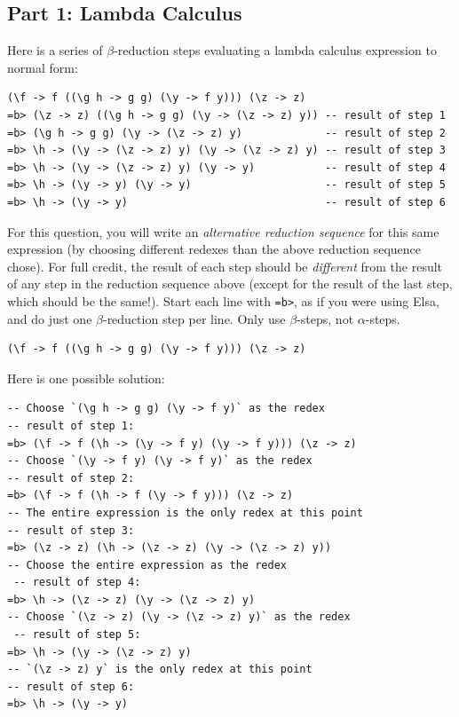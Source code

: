 \documentclass[addpoints]{exam}
\begin{document}
\begin{questions}

\subsection*{\textbf{Part 1: Lambda Calculus}}

\question[5] Here is a series of $\beta$-reduction steps evaluating a lambda calculus expression to normal form:

\begin{verbatim}
(\f -> f ((\g h -> g g) (\y -> f y))) (\z -> z)
=b> (\z -> z) ((\g h -> g g) (\y -> (\z -> z) y)) -- result of step 1
=b> (\g h -> g g) (\y -> (\z -> z) y)             -- result of step 2
=b> \h -> (\y -> (\z -> z) y) (\y -> (\z -> z) y) -- result of step 3
=b> \h -> (\y -> (\z -> z) y) (\y -> y)           -- result of step 4
=b> \h -> (\y -> y) (\y -> y)                     -- result of step 5
=b> \h -> (\y -> y)                               -- result of step 6
\end{verbatim}

For this question, you will write an \emph{alternative reduction sequence} for this same expression (by choosing different redexes than the above reduction sequence chose).  For full credit, the result of each step should be \emph{different} from the result of any step in the reduction sequence above (except for the result of the last step, which should be the same!). Start each line with \texttt{=b>}, as if you were using Elsa, and do just one $\beta$-reduction step per line. Only use $\beta$-steps, not $\alpha$-steps.

\begin{verbatim}
(\f -> f ((\g h -> g g) (\y -> f y))) (\z -> z)
\end{verbatim}
\begin{solutionorbox}[\stretch{1}]
Here is one possible solution:
\begin{verbatim}
-- Choose `(\g h -> g g) (\y -> f y)` as the redex
-- result of step 1:
=b> (\f -> f (\h -> (\y -> f y) (\y -> f y))) (\z -> z)
-- Choose `(\y -> f y) (\y -> f y)` as the redex
-- result of step 2:
=b> (\f -> f (\h -> f (\y -> f y))) (\z -> z)
-- The entire expression is the only redex at this point
-- result of step 3:
=b> (\z -> z) (\h -> (\z -> z) (\y -> (\z -> z) y))
-- Choose the entire expression as the redex
 -- result of step 4:
=b> \h -> (\z -> z) (\y -> (\z -> z) y)
-- Choose `(\z -> z) (\y -> (\z -> z) y)` as the redex
 -- result of step 5:
=b> \h -> (\y -> (\z -> z) y)
-- `(\z -> z) y` is the only redex at this point
-- result of step 6:
=b> \h -> (\y -> y)
\end{verbatim}
\end{solutionorbox}


\end{questions}
\end{document}
